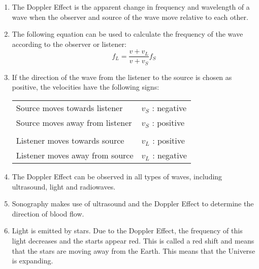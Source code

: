 \begin{enumerate}
\item 
{The Doppler Effect is the apparent change in frequency and wavelength of a wave when the observer and source of the wave move relative to each other.}
\item {The following equation can be used to calculate the frequency of the wave according to the observer or listener:
$$f_L=\frac{v + v_L}{v + v_S}f_S$$
}
\item  {
If the direction of the wave from the listener to the source is chosen as positive, the velocities have the following signs:
\begin{center}
\begin{tabular}{|ll|}
\hline
Source moves towards listener & $v_S$ : negative\\
Source moves away from listener & $v_S$ : positive\\
    &   \\
Listener moves towards source & $v_L$ : positive\\
Listener moves away from source & $v_L$ : negative\\
\hline
\end{tabular}
\end{center}
}
\item{The Doppler Effect can be observed in all types of waves, including ultrasound, light and radiowaves.}
\item{Sonography makes use of ultrasound and the Doppler Effect to determine the direction of blood flow.}
\item{Light is emitted by stars. Due to the Doppler Effect, the frequency of this light decreases and the starts appear red. This is called a red shift and means that the stars are moving away from the Earth. This means that the Universe is expanding.}
\end{enumerate}

